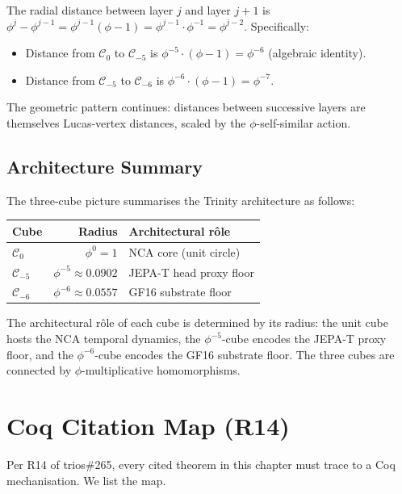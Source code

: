The radial distance between layer $j$ and layer $j+1$ is
$\phi^{j} - \phi^{j-1} = \phi^{j-1}(\phi - 1) = \phi^{j-1} \cdot
\phi^{-1} = \phi^{j-2}$. Specifically:

\begin{itemize}
\item Distance from $\mathcal{C}_{0}$ to $\mathcal{C}_{-5}$ is
  $\phi^{-5} \cdot (\phi - 1) = \phi^{-6}$ (algebraic identity).
\item Distance from $\mathcal{C}_{-5}$ to $\mathcal{C}_{-6}$ is
  $\phi^{-6} \cdot (\phi - 1) = \phi^{-7}$.
\end{itemize}

The geometric pattern continues: distances between successive
layers are themselves Lucas-vertex distances, scaled by the
$\phi$-self-similar action.

\subsection{Architecture Summary}
\label{fa_13:sec:13-arch-summary}

The three-cube picture summarises the Trinity architecture as
follows:

\begin{center}
\begin{tabular}{lrl}
Cube & Radius & Architectural rôle \\\hline
$\mathcal{C}_{0}$ & $\phi^{0} = 1$ & NCA core (unit circle) \\
$\mathcal{C}_{-5}$ & $\phi^{-5} \approx 0.0902$ & JEPA-T head proxy floor \\
$\mathcal{C}_{-6}$ & $\phi^{-6} \approx 0.0557$ & GF16 substrate floor \\
\end{tabular}
\end{center}

The architectural rôle of each cube is determined by its radius: the
unit cube hosts the NCA temporal dynamics, the $\phi^{-5}$-cube
encodes the JEPA-T proxy floor, and the $\phi^{-6}$-cube encodes
the GF16 substrate floor. The three cubes are connected by
$\phi$-multiplicative homomorphisms.

\section{Coq Citation Map (R14)}
\label{fa_13:sec:13-coq-map}

Per R14 of trios\#265, every cited theorem in this chapter must
trace to a Coq mechanisation. We list the map.

